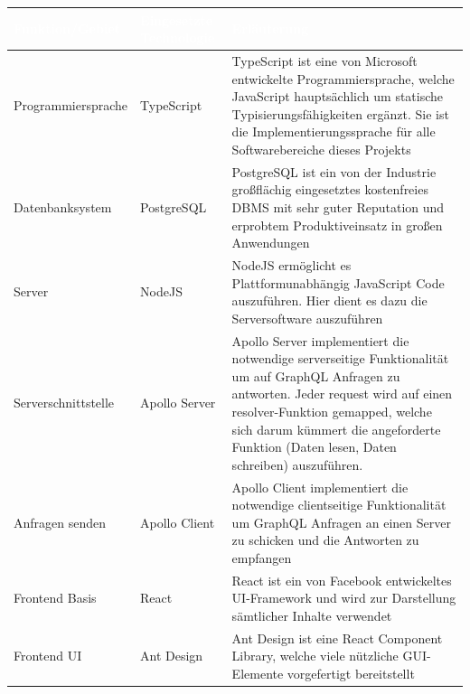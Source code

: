 \documentclass[a4paper,12pt]{article}
\begin{document}
\begin{center}
      \begin{tabular}{|m{4cm}|m{2.5cm}|m{8.5cm}|}
            \hline
        \rowcolor{TUMBlue} \textcolor{white}{\textbf{Funktion/Gebiet}} & \textcolor{white}{\textbf{Eingesetzte Technologie}} & \textcolor{white}{\textbf{Erläuterung}} \\
        \hline
        Programmiersprache & TypeScript & TypeScript ist eine von Microsoft entwickelte Programmiersprache, welche JavaScript hauptsächlich um statische Typisierungsfähigkeiten ergänzt. Sie ist die Implementierungssprache für alle Softwarebereiche dieses Projekts \\
        \hline
        Datenbanksystem & PostgreSQL & PostgreSQL ist ein von der Industrie großflächig eingesetztes kostenfreies DBMS mit sehr guter Reputation und erprobtem Produktiveinsatz in großen Anwendungen \\
        \hline
        Server & NodeJS & NodeJS ermöglicht es Plattformunabhängig JavaScript Code auszuführen. Hier dient es dazu die Serversoftware auszuführen \\
        \hline
        Serverschnittstelle & Apollo Server & Apollo Server implementiert die notwendige serverseitige Funktionalität um auf GraphQL Anfragen zu antworten. Jeder request wird auf einen resolver-Funktion gemapped, welche sich darum kümmert die angeforderte Funktion (Daten lesen, Daten schreiben) auszuführen. \\
        \hline
        Anfragen senden & Apollo Client & Apollo Client implementiert die notwendige clientseitige Funktionalität um GraphQL Anfragen an einen Server zu schicken und die Antworten zu empfangen \\
        \hline
        Frontend Basis & React & React ist ein von Facebook entwickeltes UI-Framework und wird zur Darstellung sämtlicher Inhalte verwendet \\
        \hline
        Frontend UI & Ant Design & Ant Design ist eine React Component Library, welche viele nützliche GUI-Elemente vorgefertigt bereitstellt \\
        \hline
      \end{tabular}
\end{center}
\end{document}
